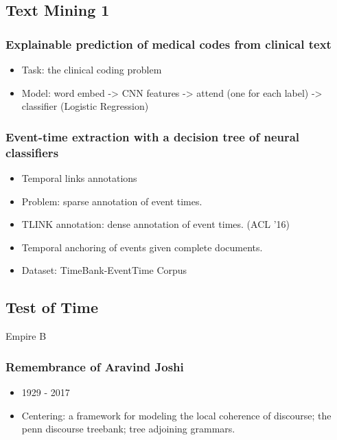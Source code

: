 \subsection{Text Mining 1}
\subsubsection{Explainable prediction of medical codes from clinical text}
\begin{itemize}
	\item Task: the clinical coding problem
	\item Model: word embed -> CNN features -> attend (one for each label) -> classifier (Logistic Regression)
\end{itemize}

\subsubsection{Event-time extraction with a decision tree of neural classifiers \cite{reimers2018event}}
\begin{itemize}
	\item Temporal links annotations
	\item Problem: sparse annotation of event times.
	\item TLINK annotation: dense annotation of event times. (ACL '16)
	\item Temporal anchoring of events given complete documents.
	\item Dataset: TimeBank-EventTime Corpus
\end{itemize}

\subsection{Test of Time}
Empire B

\subsubsection{Remembrance of Aravind Joshi}
\begin{itemize}
	\item 1929 - 2017
	\item Centering: a framework for modeling the local coherence of discourse; the penn discourse treebank; tree adjoining grammars.
\end{itemize}

